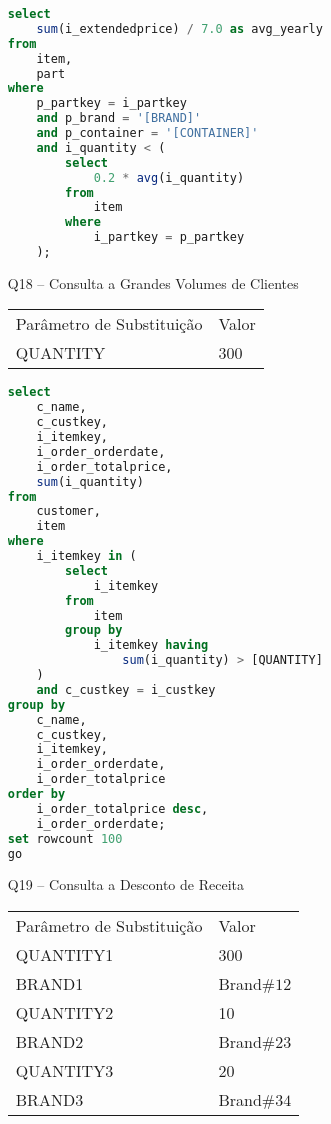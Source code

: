 \begin{enumerate}
	\begin{lstlisting}[language=SQL]
select
    sum(i_extendedprice) / 7.0 as avg_yearly
from
    item,
    part
where
    p_partkey = i_partkey
    and p_brand = '[BRAND]'
    and p_container = '[CONTAINER]'
    and i_quantity < (
        select
            0.2 * avg(i_quantity)
        from
            item
        where
            i_partkey = p_partkey
    );
	\end{lstlisting}

\item[Q18 --] Consulta a Grandes Volumes de Clientes

\begin{tabular}{ll}
	Parâmetro de Substituição & Valor\\
	QUANTITY & 300\\
\end{tabular}

	\begin{lstlisting}[language=SQL]
select
    c_name,
    c_custkey,
    i_itemkey,
    i_order_orderdate,
    i_order_totalprice,
    sum(i_quantity)
from
    customer,
    item
where
    i_itemkey in (
        select
            i_itemkey
        from
            item
        group by
            i_itemkey having
                sum(i_quantity) > [QUANTITY]
    )
    and c_custkey = i_custkey
group by
    c_name,
    c_custkey,
    i_itemkey,
    i_order_orderdate,
    i_order_totalprice
order by
    i_order_totalprice desc,
    i_order_orderdate;
set rowcount 100
go
	\end{lstlisting}
	
\item[Q19 --] Consulta a Desconto de Receita

\begin{tabular}{ll}
	Parâmetro de Substituição & Valor\\
	QUANTITY1 & 300\\
	BRAND1 & Brand$\#12$ \\
	QUANTITY2 & 10 \\
	BRAND2 & Brand$\#23$ \\
	QUANTITY3 & 20 \\
	BRAND3 & Brand$\#34$ \\
\end{tabular}


\end{enumerate}
